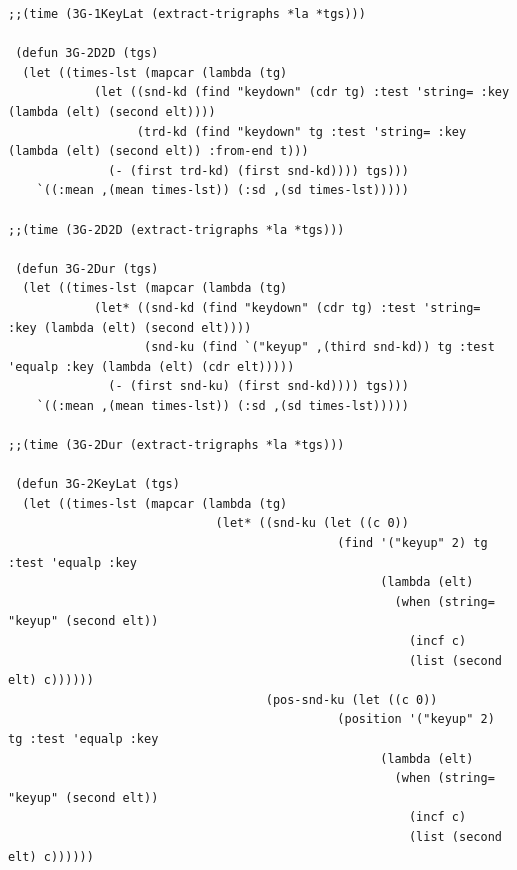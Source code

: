 \begin{lstlisting}[frame=single]
;;(time (3G-1KeyLat (extract-trigraphs *la *tgs)))

 (defun 3G-2D2D (tgs)
  (let ((times-lst (mapcar (lambda (tg)
            (let ((snd-kd (find "keydown" (cdr tg) :test 'string= :key (lambda (elt) (second elt))))
                  (trd-kd (find "keydown" tg :test 'string= :key (lambda (elt) (second elt)) :from-end t)))
              (- (first trd-kd) (first snd-kd)))) tgs)))
    `((:mean ,(mean times-lst)) (:sd ,(sd times-lst)))))

;;(time (3G-2D2D (extract-trigraphs *la *tgs)))

 (defun 3G-2Dur (tgs)
  (let ((times-lst (mapcar (lambda (tg)
            (let* ((snd-kd (find "keydown" (cdr tg) :test 'string= :key (lambda (elt) (second elt))))
                   (snd-ku (find `("keyup" ,(third snd-kd)) tg :test 'equalp :key (lambda (elt) (cdr elt)))))
              (- (first snd-ku) (first snd-kd)))) tgs)))
    `((:mean ,(mean times-lst)) (:sd ,(sd times-lst)))))

;;(time (3G-2Dur (extract-trigraphs *la *tgs)))

 (defun 3G-2KeyLat (tgs)
  (let ((times-lst (mapcar (lambda (tg)
                             (let* ((snd-ku (let ((c 0))
                                              (find '("keyup" 2) tg :test 'equalp :key 
                                                    (lambda (elt)
                                                      (when (string= "keyup" (second elt))
                                                        (incf c)
                                                        (list (second elt) c))))))
                                    (pos-snd-ku (let ((c 0))
                                              (position '("keyup" 2) tg :test 'equalp :key 
                                                    (lambda (elt)
                                                      (when (string= "keyup" (second elt))
                                                        (incf c)
                                                        (list (second elt) c))))))


\end{lstlisting}
